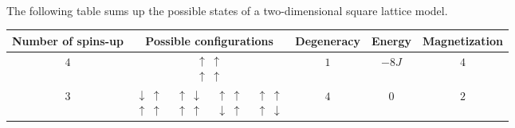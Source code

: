 \documentclass[a4paper, twoside, 11pt]{report}
\theoremstyle{theorem}
\theoremstyle{remark}
\theoremstyle{exemple}
\begin{document}
            \paragraph{}The following table sums up the possible states of a two-dimensional square lattice model.
                \begin{center}
                    \begin{tabular}{|*{8}{c|}}
                            \hline
                        Number of spins-up & \multicolumn{4}{c|}{Possible configurations} & Degeneracy & Energy & Magnetization \\
                            \hline
                            \hline
                        $4$ & \multicolumn{4}{c|}{$\begin{matrix}
                                   \uparrow & \uparrow \\
                                   \uparrow & \uparrow
                                \end{matrix}$} & $1$ & $-8J$ & $4$ \\
                            \hline
                        $3$ & $\begin{matrix}
                            \downarrow & \uparrow \\
                            \uparrow & \uparrow
                        \end{matrix}$ & $\begin{matrix}
                                            \uparrow & \downarrow \\
                                            \uparrow & \uparrow
                                         \end{matrix}$ & $\begin{matrix}
                                                               \uparrow & \uparrow \\
                                                               \downarrow & \uparrow
                                                           \end{matrix}$ & $\begin{matrix}
                                                                                \uparrow & \uparrow \\
                                                                                \uparrow & \downarrow
                                                                            \end{matrix}$ & $4$ & $0$ & $2$ \\

\end{tabular}
\end{center}
\end{document}

